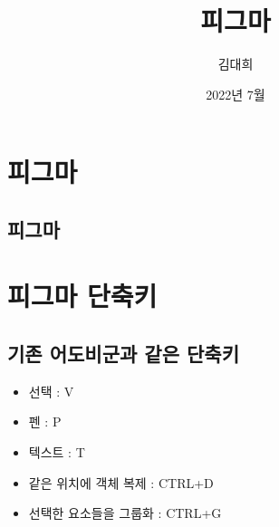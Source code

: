 \documentclass[12pt, a4paper, oneside]{book}
\begin{document}
	
			\dominitoc
			

			\title{피그마}
			\author{김대희}
			\date{2022년 7월}
			\maketitle


			\tableofcontents
			\listoffigures
			\listoftables

			

	\newpage
	\chapter{피그마}


		\newpage
		\minitoc				%


	\newpage  \null
	\section{피그마}



	\newpage
	\chapter{피그마 단축키 }


		\newpage
		\minitoc				%


	\newpage  \null


	\section{기존 어도비군과 같은 단축키}
			\begin{itemize}[topsep=0.0em, parsep=0.0em, itemsep=0em, leftmargin=6.0em, labelwidth=3em, labelsep=1em] 
			\item 	선택 : V
			\item 	펜 : P
			\item 	텍스트 : T
			\item 	같은 위치에 객체 복제 : CTRL+D
			\item 	선택한 요소들을 그룹화 :  CTRL+G
			\end{itemize}
\end{document}
